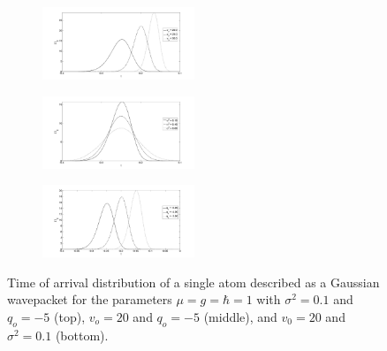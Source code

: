 \documentclass[%
 reprint,
 amsmath,amssymb,
 aps,
]{revtex4-1}
\begin{document}
\begin{figure}[t!]
\begin{subfigure}
\centering
\includegraphics[width=0.5\textwidth]{toadist_diff_po_overlay}
\label{fig:dist_diff_po}
\end{subfigure}
\begin{subfigure}
\centering
\includegraphics[width=0.5\textwidth]{toadist_diff_sigma2_overlay}
\label{fig:dist_diff_sigma2}
\end{subfigure}
\begin{subfigure}
\centering
\includegraphics[width=0.5\textwidth]{toadist_diff_qo_overlay}
\label{fig:dist_diff_qo}
\end{subfigure}
\caption{Time of arrival distribution of a single atom described as a Gaussian wavepacket for the parameters $\mu=g=\hbar=1$ with $\sigma^2=0.1$ and $q_o=-5$ (top), $v_o=20$ and $q_o=-5$ (middle), and $v_0=20$ and $\sigma^2=0.1$ (bottom).}
\label{fig:toadist_other}
\end{figure}
\end{document}
